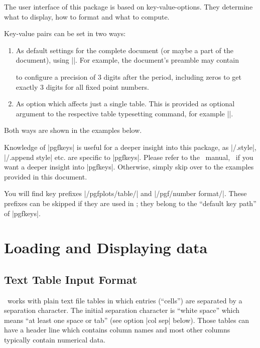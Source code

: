 \begin{command}{\pgfplotstableset{}}
	The user interface of this package is based on key-value-options. They determine what to display, how to format and what to compute.
	
	Key-value pairs can be set in two ways:
	\begin{enumerate}
		\item As default settings for the complete document (or maybe a part of the document), using |\pgfplotstableset|. For example, the document's preamble may contain
\begin{codeexample}
\end{codeexample}
			to configure a precision of $3$ digits after the period, including zeros to get exactly $3$ digits for all fixed point numbers.
		\item As option which affects just a single table. This is provided as optional argument to the respective table typesetting command, for example |\pgfplotstabletypeset|.
	\end{enumerate}
	Both ways are shown in the examples below.

	Knowledge of |pgfkeys| is useful for a deeper insight into this package, as |/.style|, |/.append style| etc. are specific to |pgfkeys|. Please refer to the \PGF\ manual,~\cite[section pgfkeys]{tikz} if you want a deeper insight into  |pgfkeys|. Otherwise, simply skip over to the examples provided in this document.

	You will find key prefixes |/pgfplots/table/| and |/pgf/number format/|. These prefixes can be skipped if they are used in \PGFPlotstable; they belong to the ``default key path'' of |pgfkeys|.
\end{command}

\section{Loading and Displaying data}
\subsection{Text Table Input Format}
\PGFPlotstable\ works with plain text file tables in which entries (``cells'') are separated by a separation character. The initial separation character is ``white space'' which means ``at least one space or tab'' (see option |col sep| below). Those tables can have a header line which contains column names and most other columns typically contain numerical data.

